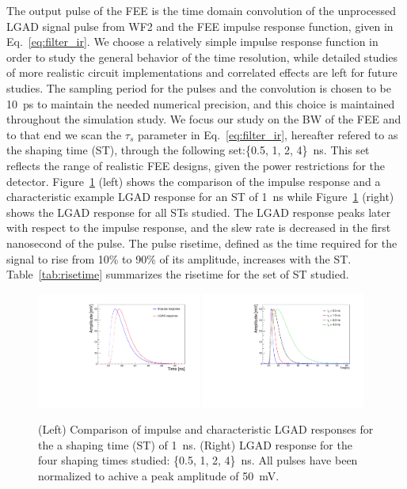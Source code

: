 \documentclass[preprint,1p]{elsarticle}
\begin{document}
The output pulse of the FEE is the time domain convolution of the
unprocessed LGAD signal pulse from WF2 and the FEE impulse response function,
given in Eq.~\ref{eq:filter_ir}. We choose a relatively simple impulse response
 function in order to study the general behavior of the time resolution,
 while detailed studies of more realistic circuit implementations and correlated effects are left for future studies.
The sampling period for the pulses and the
convolution is chosen to be 10~\si{ps} to maintain the needed numerical
precision, and this choice is maintained throughout the simulation study.
We focus our study on the BW of the FEE and to that
end we scan the $\tau_{s}$ parameter in Eq.~\ref{eq:filter_ir}, hereafter refered to as
the shaping time (ST),  through the following set:\{0.5, 1, 2, 4\}~\si{ns}.
This set reflects the range of realistic FEE designs, given the power restrictions
for the detector. Figure~\ref{fig:ir_and_lgad} (left) shows the comparison of the
impulse response and a characteristic example LGAD response for an ST of 1~\si{ns} while
Figure~\ref{fig:ir_and_lgad} (right) shows the LGAD response for all STs
studied. The LGAD response peaks later with respect to the
impulse response, and the slew rate is decreased in the first nanosecond
of the pulse. The pulse risetime, defined as the time required for the signal to rise from 10\% to 90\% of its
amplitude,  increases with the ST. Table~\ref{tab:risetime} summarizes the risetime
for the set of ST studied.

\begin{figure}[htbp]
  \centering
  \includegraphics[width=0.48\textwidth]{figs/impulse_vs_lgad_response_1ns_shaping.pdf} \hfill
  \includegraphics[width=0.48\textwidth]{figs/lgad_all_shaping_time_noiseless.pdf}
  \caption{(Left) Comparison of impulse and characteristic LGAD responses for the a shaping time (ST) of 1~\si{ns}.
  (Right) LGAD response for the four shaping times studied: \{0.5, 1, 2, 4\}~\si{ns}. All pulses have been normalized
  to achive a peak amplitude of 50~\si{mV}. }
  \label{fig:ir_and_lgad}
\end{figure}
\end{document}
